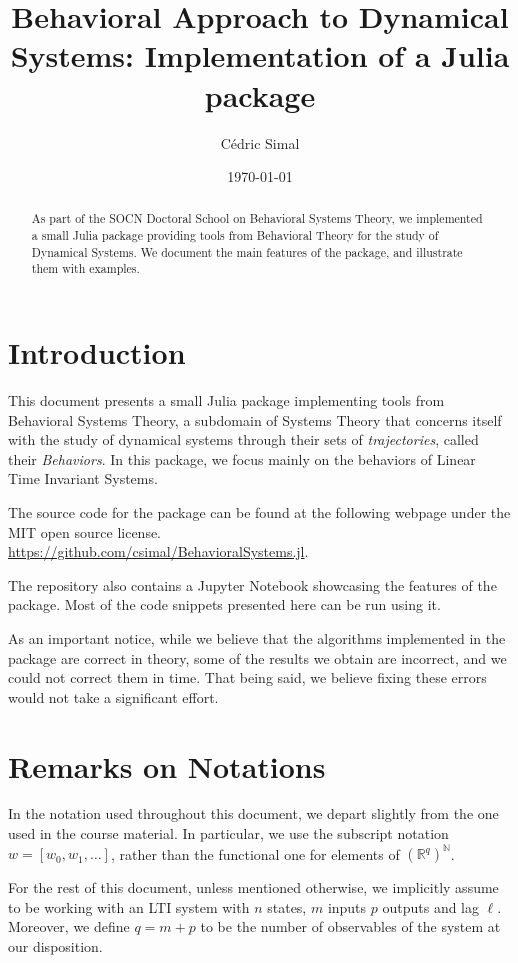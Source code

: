 \documentclass[11pt]{article}
\author{Cédric Simal}
\date{\today}
\title{Behavioral Approach to Dynamical Systems: Implementation of a Julia package}
\def\N{\mathbb{N}}
\def\R{\mathbb{R}}
\begin{document}
\maketitle

\begin{abstract}
    As part of the SOCN Doctoral School on Behavioral Systems Theory, we implemented a small Julia package providing tools from Behavioral Theory for the study of Dynamical Systems. We document the main features of the package, and illustrate them with examples.
\end{abstract}

\section*{Introduction}
This document presents a small Julia package implementing tools from Behavioral Systems Theory, a subdomain of Systems Theory that concerns itself with the study of dynamical systems through their sets of \textit{trajectories}, called their \textit{Behaviors}. In this package, we focus mainly on the behaviors of Linear Time Invariant Systems.

The source code for the package can be found at the following webpage under the MIT open source license.\\
\url{https://github.com/csimal/BehavioralSystems.jl}.

The repository also contains a Jupyter Notebook showcasing the features of the package. Most of the code snippets presented here can be run using it.

As an important notice, while we believe that the algorithms implemented in the package are correct in theory, some of the results we obtain are incorrect, and we could not correct them in time. That being said, we believe fixing these errors would not take a significant effort.

\section*{Remarks on Notations}
In the notation used throughout this document, we depart slightly from the one used in the course material. In particular, we use the subscript notation $w = [w_0, w_1, \dots]$, rather than the functional one for elements of $(\R^q)^\N$.

For the rest of this document, unless mentioned otherwise, we implicitly assume to be working with an LTI system with $n$ states, $m$ inputs $p$ outputs and lag $\ell$. Moreover, we define $q=m+p$ to be the number of observables of the system at our disposition.
\end{document}

